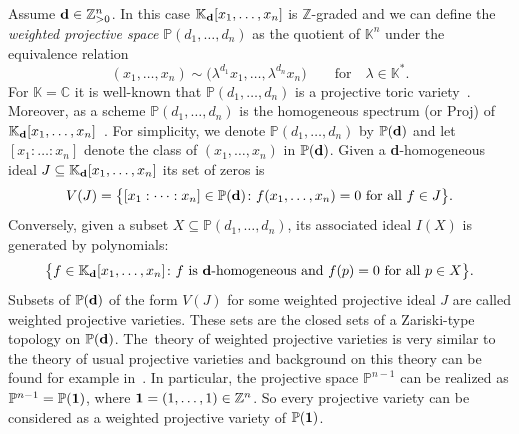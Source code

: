 \documentclass[pdftex]{sigma}%
\numberwithin{equation}{section}
\begin{document}
Assume ${\bf d}\in \mathbb Z^n_{> 0}$. In this case $\mathbb K_{\bf d}[x_1, \dots , x_n]$ is $\mathbb Z$-graded and we can define the {\it weighted projective space} $\mathbb P (d_1, \dots , d_n)$ as the quotient of $\mathbb K^n$ under the equivalence relation
\begin{displaymath}
(x_1,\dots , x_n) \sim \big(\lambda^{d_1}x_1, \dots ,\lambda^{d_n} x_n\big) \qquad\text{for}\quad\lambda \in \mathbb K^{\ast}.
\end{displaymath}
For $\mathbb K = \mathbb C$ it is well-known that $\mathbb P (d_1, \dots , d_n)$ is a projective toric variety~\cite{CLS}.
Moreover, as a scheme $\mathbb P(d_1,\dots,d_n)$ is the homogeneous spectrum (or Proj) of $\mathbb K_{\bf d}[x_1,\dots,x_n]$~\cite[Notation~1.1]{Dolgachev}.
For simplicity, we denote $\mathbb P (d_1, \dots , d_n)$ by $\mathbb P ({\bf d})$ and let $[x_1:\dots : x_n]$ denote the class of $(x_1, \dots , x_n)$ in $\mathbb P ({\bf d})$.
Given a {\bf d}-homogeneous ideal $J \subseteq \mathbb K_{\bf d}[x_1, \dots , x_n]$ its set of zeros is
\begin{displaymath}
V(J)=\big\{ [x_1:\dots : x_n]\in \mathbb P ({\bf d}) \colon f(x_1,\dots , x_n)=0\text{ for all }f\in J\big\}.
\end{displaymath}
Conversely, given a subset $X \subseteq \mathbb P (d_1,\dots,d_n)$, its associated ideal $I(X)$ is generated by polynomials:
\begin{displaymath}
\big\{ f \in \mathbb K_{\bf d}[x_1,\dots , x_n] \colon f \text{ is }{\bf d}\text{-homogeneous and }f(p)=0\text{ for all }p\in X \big\}.
\end{displaymath}
Subsets of $\mathbb P({\bf d})$ of the form $V(J)$ for some weighted projective ideal $J$ are called weighted projective varieties.
These sets are the closed sets of a Zariski-type topology on $ \mathbb P({\bf d})$.
The~the\-ory of weighted projective varieties is very similar to the theory of usual projective varieties and background on this theory can be found for example in~\cite{Dolgachev,Hosgood,Reid}. In particular, the projective space $\mathbb{P}^{n-1}$ can be realized as $\mathbb{P}
^{n-1}=\mathbb P ({\bf 1})$, where ${\bf 1}=(1, \dots , 1)\in \mathbb Z^n$. So every projective variety can be considered as a weighted projective variety of $\mathbb P ({\bf 1})$.
\end{document}
